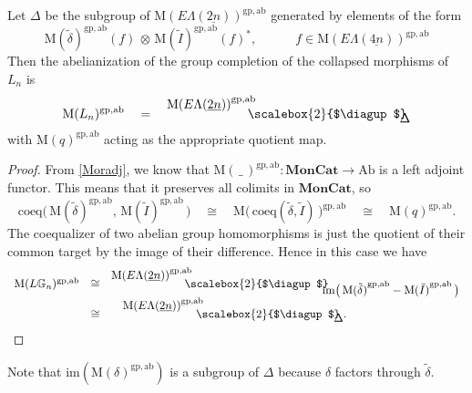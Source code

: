 \documentclass{amsbook} %
\newcommand{\mb}{\mathbf}
\newcommand{\bigquotient}[2]{ \raisebox{0.75\height}{$#1$} \mkern-12mu\scalebox{2}{$\diagup$}\mkern-10mu \raisebox{-0.5\height}{$#2$} }
\newcommand{\ELnn}{E\Lambda(\underline{2n})}
\newcommand{\ELnnnn}{E\Lambda(\underline{4n})}
\newcommand{\moncat}{\ensuremath{\mb{MonCat}}}
\numberwithin{section}{chapter}
\begin{document}
\begin{prop}\label{Zmor2} Let $\Delta$ be the subgroup of $\mathrm{M}(\ELnn)^{\mathrm{gp, ab}}$ generated by elements of the form
\[ \mathrm{M}(\tilde{\delta})^{\mathrm{gp, ab}}(f) \, \otimes \, \mathrm{M}(\tilde{I})^{\mathrm{gp, ab}}(f)^*, \quad \quad \quad f \in \mathrm{M}(\ELnnnn)^{\mathrm{gp, ab}} \]
Then the abelianization of the group completion of the collapsed morphisms of $L_n$ is 
\[ \mathrm{M}(L_n)^{\mathrm{gp, ab}} \quad = \quad \bigquotient{{\mathrm{M}(\ELnn)}^{\mathrm{gp, ab}}}{\Delta} \]
with $\mathrm{M}(q)^{\mathrm{gp, ab}}$ acting as the appropriate quotient map. 
\end{prop}
\begin{proof}
From \cref{Moradj}, we know that $\mathrm{M}(\, \_ \,)^{\mathrm{gp, ab}}: \moncat \to \mathrm{Ab}$ is a left adjoint functor. This means that it preserves all colimits in $\moncat$, so
\[ \mathrm{coeq}\big( \, \mathrm{M}(\tilde{\delta})^{\mathrm{gp, ab}}, \, \mathrm{M}(\tilde{I})^{\mathrm{gp, ab}} \, \big) \quad \cong \quad \mathrm{M}\big( \, \mathrm{coeq}(\tilde{\delta}, \tilde{I}) \, \big)^{\mathrm{gp, ab}} \quad \cong \quad \mathrm{M}(q)^{\mathrm{gp, ab}}. \]
The coequalizer of two abelian group homomorphisms is just the quotient of their common target by the image of their difference. Hence in this case we have
\[ 
\begin{array}{rcl}
\mathrm{M}(L\mathbb{G}_{n})^{\mathrm{gp, ab}}  & \cong &  \bigquotient{{\mathrm{M}(\ELnn)}^{\mathrm{gp, ab}}}{\mathrm{im}\big( \, {\mathrm{M}(\tilde{\delta})}^{\mathrm{gp, ab}} - {\mathrm{M}(\tilde{I})}^{\mathrm{gp, ab}} \, \big)} \\
& \cong & \quad \bigquotient{{\mathrm{M}(\ELnn)}^{\mathrm{gp, ab}}}{\Delta}.
\end{array}
\]
\end{proof} 

\begin{rem}\label{delta_neq_image}
Note that $\mathrm{im}(\mathrm{M}(\delta)^{\mathrm{gp, ab}})$ is a subgroup of $\Delta$ because $\delta$ factors through $\tilde{\delta}$.
\end{rem}
\end{document}
